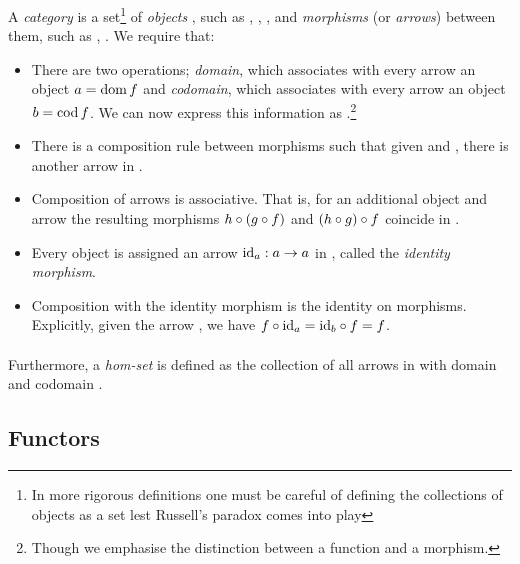 \begin{categorydef}
  A \emph{category}  is a set\footnote{In more rigorous definitions one must be careful of defining the collections of objects as a set lest Russell's paradox comes into play} of \emph{objects} , such as , , , and \emph{morphisms} (or \emph{arrows})  between them, such as , . We require that:
  \begin{itemize}
    \item There are two operations; \emph{domain}, which associates with every
        arrow  an object $\mathnormal{a} = \mathrm{dom}\,\mathnormal{f}$ and \emph{codomain}, which associates with every arrow  an object $\mathnormal{b} = \mathrm{cod}\,\mathnormal{f}$. We can now express this information as .\footnote{Though we emphasise the distinction between a function and a morphism.}
    \item There is a composition rule between morphisms such that given  and , there is another arrow  in .
    \item Composition of arrows is associative. That is, for an additional object  and arrow  the resulting morphisms $\mathnormal{h} \circ \left(\mathnormal{g} \circ \mathnormal{f}\right)$ and $\left(\mathnormal{h} \circ \mathnormal{g}\right) \circ \mathnormal{f}$ coincide in .
    \item Every object  is assigned an arrow $\mathrm{id}_{\mathnormal{a}}: \mathnormal{a} \to \mathnormal{a}$ in , called the \emph{identity morphism}.
    \item Composition with the identity morphism is the identity on morphisms. Explicitly, given the arrow , we have $\mathnormal{f} \circ \mathrm{id}_{\mathnormal{a}} = \mathrm{id}_{\mathnormal{b}} \circ \mathnormal{f} = \mathnormal{f}$.
  \end{itemize}
\end{categorydef}

\paragraph{}Furthermore, a \emph{hom-set}  is
defined as the collection of all arrows in  with domain  and
codomain .

\subsection{Functors}
\theoremstyle{definition}\newtheorem*{covfunctordef}{Functor}

